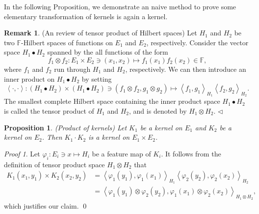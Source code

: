 \documentclass[a4paper,12pt]{article}
\newtheorem{prp}[thm]{Proposition}
\theoremstyle{remark}
\newtheorem*{prf}{Proof}
\theoremstyle{definition}
\newtheorem{rem}[thm]{Remark}
\theoremstyle{definition}
\theoremstyle{definition}
\newcommand{\ip}[2]{\left<#1, #2 \right>}
\newcommand{\fin}{\hfill \( \triangleleft \) }
\begin{document}
In the following Proposition, we demonstrate an naive method to prove some elementary transformation of kernels is again a kernel.
\begin{rem} (An review of tensor product of Hilbert spaces)
	Let \( H_1 \) and \( H_2 \) be two \( \mathbb{F} \)-Hilbert spaces of functions on \( E_1 \) and \( E_2 \), respectively. Consider the vector space \( H_1 \bullet H_2 \) spanned by the all functions of the form
	\begin{equation*}
		f_1 \otimes f_2: E_1 \times E_2 \ni (x_1,x_2) \mapsto f_1(x_1)f_2(x_2) \in \mathbb{F},
	\end{equation*}
	where \( f_1 \) and \( f_2 \) run through \( H_1 \) and \( H_2 \), respectively.
	We can then introduce an inner product on \( H_1 \bullet H_2 \) by setting
	\begin{equation*}
		\ip{\cdot }{\cdot } : \left( H_1 \bullet H_2 \right) \times \left( H_1 \bullet H_2 \right) \ni (f_1 \otimes f_2, g_1 \otimes  g_2) \mapsto \ip{f_1}{g_1}_{H_1} \ip{f_2}{g_2}_{H_2}.
	\end{equation*}
	The smallest complete Hilbert space containing the inner product space \( H_1 \bullet H_2 \) is called the tensor product of \( H_1 \) and \( H_2 \), and is denoted by \( H_1 \otimes H_2 \).
	\fin\end{rem}
\begin{prp} (Product of kernels)
	Let \( K_1 \) be a kernel on \( E_1 \) and \( K_2 \) be a kernel on \( E_2 \). Then \( K_1 \cdot K_2 \) is a kernel on \( E_1 \times E_2 \).
\end{prp}
\begin{prf}
	Let \( \varphi_i : E_i \ni x \mapsto H_i \) be a feature map of \( K_i \). It follows from the definition of tensor product space \( H_1 \otimes H_2 \) that
	\begin{equation*}
		\begin{aligned}
			K_1(x_1,y_1) \times K_2(x_2,y_2)
			 & = \ip{\varphi_1(y_1)}{\varphi_1(x_1)}_{H_1} \ip{\varphi_2(y_2)}{\varphi_2(x_2)}_{H_2}                  \\
			 & = \ip{\varphi_1(y_1) \otimes \varphi_2(y_2)}{\varphi_1(x_1) \otimes \varphi_2(x_2)}_{H_1 \otimes H_2},
		\end{aligned}
	\end{equation*}
	which justifies our claim.
	\qed\end{prf}
\end{document}
